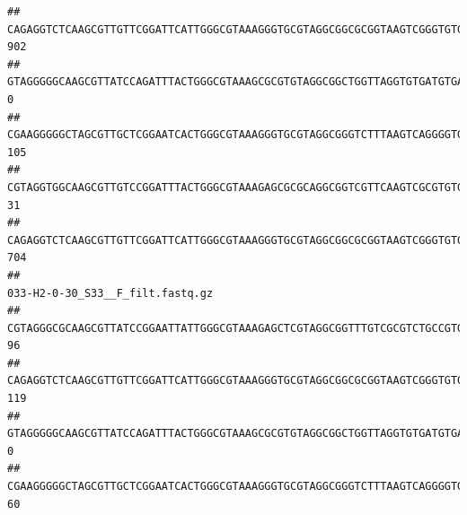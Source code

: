 \documentclass[]{article}
\begin{document}
\begin{verbatim}
## CAGAGGTCTCAAGCGTTGTTCGGATTCATTGGGCGTAAAGGGTGCGTAGGCGGCGCGGTAAGTCGGGTGTGAAATCTCGGAGCTTAACTCCGAAACTGCATTCGATACTGCCGTGCTTGAGGACTGGAGAGGAGACTGGAATTTACGGTGTAGCGGTGAAATGCGTAGATATCGTAAGGAAGACCAGTGGCGAAGGCGGGTCTCTGGACAGTTCCTGACGCTGAGGCACGAAGGCCAGGGGAGCAAACG                               902
## GTAGGGGGCAAGCGTTATCCAGATTTACTGGGCGTAAAGCGCGTGTAGGCGGCTGGTTAGGTGTGATGTGAAATCTTCCGGCTCAACCGGAAAACTGCATTGCAAACCGGCCTGGCTAGAGTGCAGGAGAGGGAAGCGGAATTCCAGGTGTAGCGGTGAAATGCGTAGATATCTGGAGGAACACCAGTGGCGAAGGCGGCTTCCTGGCCTGCAACTGACGCTGAGACGCGAAAGCGTGGGGAGCGAAC                                  0
## CGAAGGGGGCTAGCGTTGCTCGGAATCACTGGGCGTAAAGGGTGCGTAGGCGGGTCTTTAAGTCAGGGGTGAAATCCTGGAGCTCAACTCCAGAACTGCCTTTGATACTGAAGATCTTGAGTTCGGGAGAGGTGAGTGGAACTGCGAGTGTAGAGGTGAAATTCGTAGATATTCGCAAGAACACCAGTGGCGAAGGCGGCTCACTGGCCCGATACTGACGCTGAGGCACGAAAGCGTGGGGAGCAAACA                               105
## CGTAGGTGGCAAGCGTTGTCCGGATTTACTGGGCGTAAAGAGCGCGCAGGCGGTCGTTCAAGTCGCGTGTGAAAGCCCCCGGCTCAACTGGGGAGGGTCACGCGATACTGATCGACTCGAAGGCAGGAGAGGGTAGTGGAATTCCCGGTGTAGTGGTGAAATGCGTAGATATCGGGAGGAACACCAGTGGCGAAGGCGACTACCTGGCCTGTTCTTGACGCTGAGGCGCGAAAGCTAGGGGAGCAAACG                                31
## CAGAGGTCTCAAGCGTTGTTCGGATTCATTGGGCGTAAAGGGTGCGTAGGCGGCGCGGTAAGTCGGGTGTGAAATCTCGGGGCTTAACTCCGAAACTGCATTCGATACTGCCGTGCTTGAGGACTGGAGAGGAGACTGGAATTTACGGTGTAGCGGTGAAATGCGTAGATATCGTAAGGAAGACCAGTGGCGAAGGCGGGTCTCTGGACAGTTCCTGACGCTGAGGCACGAAGGCCAGGGGAGCAAACG                               704
##                                                                                                                                                                                                                                                           033-H2-0-30_S33__F_filt.fastq.gz
## CGTAGGGCGCAAGCGTTATCCGGAATTATTGGGCGTAAAGAGCTCGTAGGCGGTTTGTCGCGTCTGCCGTGAAAGTCCGGGGCTCAACTCCGGATCTGCGGTGGGTACGGGCAGACTAGAGTGATGTAGGGGAGACTGGAATTCCTGGTGTAGCGGTGAAATGCGCAGATATCAGGAGGAACACCGATGGCGAAGGCAGGTCTCTGGGCATTAACTGACGCTGAGGAGCGAAAGCATGGGGAGCGAACA                               96
## CAGAGGTCTCAAGCGTTGTTCGGATTCATTGGGCGTAAAGGGTGCGTAGGCGGCGCGGTAAGTCGGGTGTGAAATCTCGGAGCTTAACTCCGAAACTGCATTCGATACTGCCGTGCTTGAGGACTGGAGAGGAGACTGGAATTTACGGTGTAGCGGTGAAATGCGTAGATATCGTAAGGAAGACCAGTGGCGAAGGCGGGTCTCTGGACAGTTCCTGACGCTGAGGCACGAAGGCCAGGGGAGCAAACG                              119
## GTAGGGGGCAAGCGTTATCCAGATTTACTGGGCGTAAAGCGCGTGTAGGCGGCTGGTTAGGTGTGATGTGAAATCTTCCGGCTCAACCGGAAAACTGCATTGCAAACCGGCCTGGCTAGAGTGCAGGAGAGGGAAGCGGAATTCCAGGTGTAGCGGTGAAATGCGTAGATATCTGGAGGAACACCAGTGGCGAAGGCGGCTTCCTGGCCTGCAACTGACGCTGAGACGCGAAAGCGTGGGGAGCGAAC                                 0
## CGAAGGGGGCTAGCGTTGCTCGGAATCACTGGGCGTAAAGGGTGCGTAGGCGGGTCTTTAAGTCAGGGGTGAAATCCTGGAGCTCAACTCCAGAACTGCCTTTGATACTGAAGATCTTGAGTTCGGGAGAGGTGAGTGGAACTGCGAGTGTAGAGGTGAAATTCGTAGATATTCGCAAGAACACCAGTGGCGAAGGCGGCTCACTGGCCCGATACTGACGCTGAGGCACGAAAGCGTGGGGAGCAAACA                               60

\end{verbatim}
\end{document}
